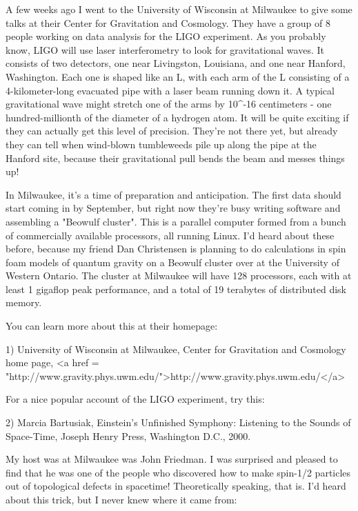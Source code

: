 


A few weeks ago I went to the University of Wisconsin at Milwaukee to
give some talks at their Center for Gravitation and Cosmology.  They
have a group of 8 people working on data analysis for the LIGO
experiment.  As you probably know, LIGO will use laser interferometry to
look for gravitational waves.  It consists of two detectors, one near
Livingston, Louisiana, and one near Hanford, Washington.  Each one is
shaped like an L, with each arm of the L consisting of a
4-kilometer-long evacuated pipe with a laser beam running down it.  A
typical gravitational wave might stretch one of the arms by 10^{-16}
centimeters - one hundred-millionth of the diameter of a hydrogen atom.
It will be quite exciting if they can actually get this level of
precision.  They're not there yet, but already they can tell when
wind-blown tumbleweeds pile up along the pipe at the Hanford site,
because their gravitational pull bends the beam and messes things up!

In Milwaukee, it's a time of preparation and anticipation.  The first
data should start coming in by September, but right now they're busy
writing software and assembling a "Beowulf cluster".  This is a parallel
computer formed from a bunch of commercially available processors, all
running Linux.  I'd heard about these before, because my friend Dan
Christensen is planning to do calculations in spin foam models of
quantum gravity on a Beowulf cluster over at the University of Western
Ontario.  The cluster at Milwaukee will have 128 processors, each with
at least 1 gigaflop peak performance, and a total of 19 terabytes of
distributed disk memory.  

You can learn more about this at their homepage:

1) University of Wisconsin at Milwaukee, Center for Gravitation
and Cosmology home page, <a href = "http://www.gravity.phys.uwm.edu/">http://www.gravity.phys.uwm.edu/</a>

For a nice popular account of the LIGO experiment, try this:

2) Marcia Bartusiak, Einstein's Unfinished Symphony: Listening
to the Sounds of Space-Time, Joseph Henry Press, Washington D.C., 2000. 

My host was at Milwaukee was John Friedman.  I was surprised and pleased
to find that he was one of the people who discovered how to make spin-1/2 
particles out of topological defects in spacetime!  Theoretically
speaking, that is.  I'd heard about this trick, but I never knew where
it came from:

